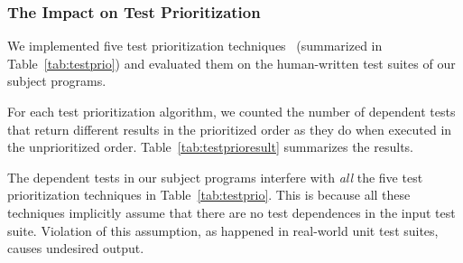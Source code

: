 
\subsubsection{The Impact on Test Prioritization}
\label{sec:impact}

We implemented five test prioritization techniques~\cite{Elbaum:2000:PTC:347324.348910} (summarized in Table~\ref{tab:testprio}) and
evaluated them on the human-written test suites of our subject programs.


For each test prioritization algorithm, we counted the number
of dependent tests that return different results in
the prioritized order as they do when executed in the
unprioritized order. Table~\ref{tab:testprioresult} summarizes
the results.

The dependent tests in our subject programs interfere with
\textit{all} the five test prioritization techniques in
Table~\ref{tab:testprio}. This is because all these techniques
implicitly assume that there are no test dependences in
the input test suite. Violation of this assumption, as
happened in real-world unit test suites, causes undesired output.





